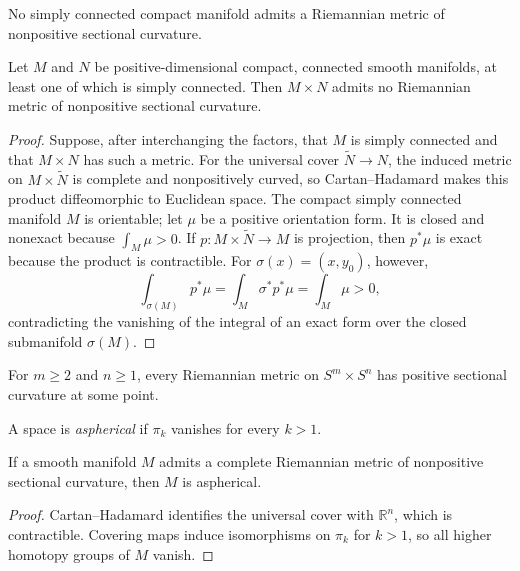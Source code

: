 \begin{corollary}
\label{cor:no-simply-connected-compact-nonpositive}
No simply connected compact manifold admits a Riemannian metric of
nonpositive sectional curvature.
\end{corollary}

\begin{corollary}
\label{cor:product-manifolds-nonpositive}

Let $M$ and $N$ be positive-dimensional compact, connected smooth manifolds,
at least one of which is simply connected.  Then $M\times N$ admits no
Riemannian metric of nonpositive sectional curvature.
\begin{proof}
\sketch Suppose, after interchanging the factors, that $M$ is simply connected
and that $M\times N$ has such a metric.  For the universal cover
$\widetilde N\to N$, the induced metric on $M\times\widetilde N$ is complete
and nonpositively curved, so Cartan--Hadamard makes this product diffeomorphic
to Euclidean space.  The compact simply connected manifold $M$ is orientable;
let $\mu$ be a positive orientation form.  It is closed and nonexact because
$\int_M\mu>0$.  If $p:M\times\widetilde N\to M$ is projection, then $p^*\mu$
is exact because the product is contractible.  For
$\sigma(x)=(x,y_0)$, however,
\[
\int_{\sigma(M)}p^*\mu=\int_M\sigma^*p^*\mu=\int_M\mu>0,
\]
contradicting the vanishing of the integral of an exact form over the closed
submanifold $\sigma(M)$.
\end{proof}
\end{corollary}

\begin{example}
\label{ex:positive-curvature-on-product-spheres}
For $m\geq2$ and $n\geq1$, every Riemannian metric on $S^m\times S^n$ has
positive sectional curvature at some point.
\end{example}

A space is \emph{aspherical} if $\pi_k$ vanishes for every $k>1$.

\begin{corollary}
\label{cor:nonpositive-implies-aspherical}
If a smooth manifold $M$ admits a complete Riemannian metric of nonpositive
sectional curvature, then $M$ is aspherical.
\begin{proof}
\sketch Cartan--Hadamard identifies the universal cover with $\mathbb R^n$,
which is contractible.  Covering maps induce isomorphisms on $\pi_k$ for
$k>1$, so all higher homotopy groups of $M$ vanish.
\end{proof}
\end{corollary}

